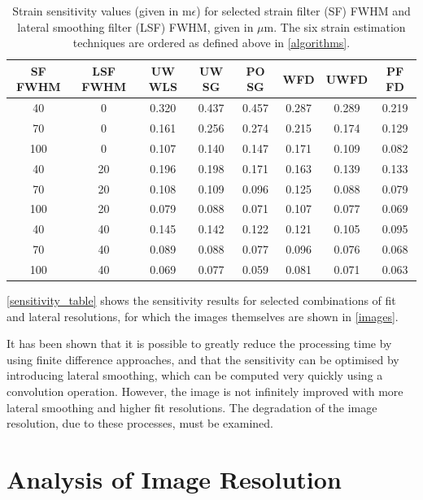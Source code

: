 \begin{table}[h]
	\begin{center}
		\begin{tabular}{|c c|c c c c c c|}
			\hline 
			SF FWHM & LSF FWHM & UW WLS & UW SG & PO SG & WFD & UWFD & PF FD \\
			\hline
			\hline
			40 & 0 & 0.320 & 0.437 & 0.457 & 0.287 & 0.289 & 0.219 \\
			70 & 0 & 0.161 & 0.256 & 0.274 & 0.215 & 0.174 & 0.129 \\
			100 & 0 & 0.107 & 0.140 & 0.147 & 0.171 & 0.109 & 0.082 \\
			40 & 20 & 0.196 & 0.198 & 0.171 & 0.163 & 0.139 & 0.133 \\
			70 & 20 & 0.108 & 0.109 & 0.096 & 0.125 & 0.088 & 0.079 \\
			100 & 20 & 0.079 & 0.088 & 0.071 & 0.107 & 0.077 & 0.069 \\
			40 & 40 & 0.145 & 0.142 & 0.122 & 0.121 & 0.105 & 0.095 \\
			70 & 40 & 0.089 & 0.088 & 0.077 & 0.096 & 0.076 & 0.068 \\
			100 & 40 & 0.069 & 0.077 & 0.059 & 0.081 & 0.071 & 0.063 \\
			\hline
		\end{tabular}
	\end{center}
	\caption{Strain sensitivity values (given in m$\epsilon$) for selected strain filter (SF) FWHM and lateral smoothing filter (LSF) FWHM, given in $\mu$m. The six strain estimation techniques are ordered as defined above in \autoref{algorithms}.}
	\label{sensitivity_table}
\end{table}

\autoref{sensitivity_table} shows the sensitivity results for selected combinations of fit and lateral resolutions, for which the images themselves are shown in \autoref{images}.

It has been shown that it is possible to greatly reduce the processing time by using finite difference approaches, and that the sensitivity can be optimised by introducing lateral smoothing, which can be computed very quickly using a convolution operation. However, the image is not infinitely improved with more lateral smoothing and higher fit resolutions. The degradation of the image resolution, due to these processes, must be examined. 

\section{Analysis of Image Resolution} \label{image_res_results}

